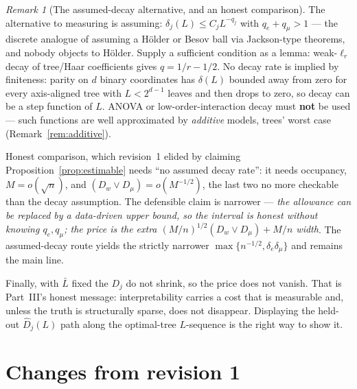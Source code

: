 \documentclass[11pt]{article}
\theoremstyle{plain}
\theoremstyle{definition}
\theoremstyle{remark}
\newtheorem{remark}{Remark}
\newcommand{\Dw}{D_w}
\newcommand{\Dm}{D_\mu}
\begin{document}
\begin{remark}[The assumed-decay alternative, and an honest comparison]
\label{rem:assumed-decay}
The alternative to measuring is assuming: $\delta_j(L)\le C_jL^{-q_j}$ with
$q_e+q_\mu>1$ --- the discrete analogue of assuming a H\"older or Besov ball via
Jackson-type theorems, and nobody objects to H\"older. Supply a sufficient
condition as a lemma: weak-$\ell_r$ decay of tree/Haar coefficients gives
$q=1/r-1/2$. No decay rate is implied by finiteness: parity on $d$ binary
coordinates has $\delta(L)$ bounded away from zero for every axis-aligned tree
with $L<2^{d-1}$ leaves and then drops to zero, so decay can be a step function of
$L$. ANOVA or low-order-interaction decay must \textbf{not} be used --- such
functions are well approximated by \emph{additive} models, trees' worst case
(Remark~\ref{rem:additive}).

Honest comparison, which revision~1 elided by claiming
Proposition~\ref{prop:estimable} needs ``no assumed decay rate'': it needs
occupancy, $M=o(\sqrt n)$, and $(\Dw\vee\Dm)=o(M^{-1/2})$, the last two no more
checkable than the decay assumption. The defensible claim is narrower --- \emph{the
allowance can be replaced by a data-driven upper bound, so the interval is honest
without knowing $q_e,q_\mu$; the price is the extra
$(M/n)^{1/2}(\Dw\vee\Dm)+M/n$ width}. The assumed-decay route yields the strictly
narrower $\max\{n^{-1/2},\delta_e\delta_\mu\}$ and remains the main line.

Finally, with $\bar L$ fixed the $D_j$ do not shrink, so the price does not
vanish. That is Part~III's honest message: interpretability carries a cost that is
measurable and, unless the truth is structurally sparse, does not disappear.
Displaying the held-out $\widehat D_j(L)$ path along the optimal-tree
$L$-sequence is the right way to show it.
\end{remark}

\section{Changes from revision 1}\label{sec:changes}
\end{document}
